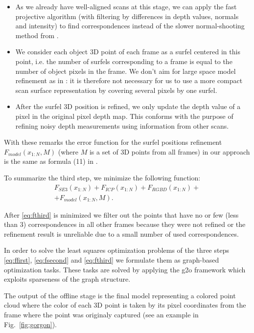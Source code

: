 \documentclass[letterpaper, 10 pt, conference]{ieeeconf}  %
\begin{document}
\begin{itemize}
 \item As we already have well-aligned scans at this stage, we can apply 
 the fast projective algorithm \cite{rusinkiewicz2001efficient} 
 (with filtering by differences in depth values, 
 normals and intensity) to find correspondences instead of the slower
 normal-shooting method from \cite{ruhnke2012highly}.
 \item We consider each object 3D point of each frame as 
 a surfel centered in this point, i.e. the number of surfels corresponding to a frame
 is equal to the number of object pixels in the frame. 
 We don't aim for large space model refinement as in \cite{ruhnke2012highly}:
 it is therefore not necessary for us to use a more compact scan surface representation by covering several pixels 
 by one surfel.
 \item After the surfel 3D position is refined, we only update the depth value 
 of a pixel in the original pixel depth map. This conforms with the purpose of
 refining noisy depth measurements using information from other scans.
\end{itemize}

With these remarks the error function for the surfel positions refinement 
$F_{model}(x_{1:N}, M)$ (where $M$ is a set of 3D points from 
all frames) in our approach is the same as formula (11) in \cite{ruhnke2012highly}.

To summarize the third step, we minimize the following function:
\begin{multline} \label{eq:fthird}
F_{SE3}(x_{1:N}) + F_{ICP}(x_{1:N}) + F_{RGBD}(x_{1:N}) + \\
+ F_{model}(x_{1:N}, M).
\end{multline}

After \eqref{eq:fthird} is minimized we filter out the points 
that have no or few (less than 3) correspondences in
all other frames because they were not refined or the refinement result
is unreliable due to a small number of used correspondences.

In order to solve the least squares optimization problems 
of the three steps \eqref{eq:ffirst}, \eqref{eq:fsecond} and \eqref{eq:fthird} 
we formulate them as graph-based optimization tasks.
These tasks are solved by applying the g2o framework 
\cite{kuemmerle2011g2o} which exploits sparseness of the graph structure.

The output of the offline stage is the final model representing
a colored point cloud where the color of each 3D point is taken 
by its pixel coordinates from the frame where the point was originaly 
captured (see an example in Fig.~\ref{fig:gorgon}).
\end{document}
